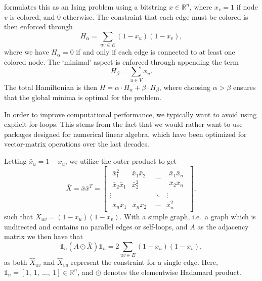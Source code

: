 \textcite{IsingFormulations} formulates this as an Ising problem using a bitstring $x \in \mathbb{R}^n$, where $x_v = 1$ if node $v$ is colored, and $0$ otherwise.
The constraint that each edge must be colored is then enforced through
\begin{equation}\label{eq:edge_cover}
    H_{\alpha} = \sum_{uv \in E} (1 - x_u) (1 - x_v),
\end{equation}
where we have $H_{\alpha} = 0$ if and only if each edge is connected to at least one colored node.
The `minimal' aspect is enforced through appending the term
\begin{equation}
    H_{\beta} = \sum_{u \in V} x_u.
\end{equation}
The total Hamiltonian is then $H = \alpha \cdot H_{\alpha} + \beta \cdot H_{\beta}$, where choosing $\alpha > \beta$ ensures that the global minima is optimal for the problem.

In order to improve computational performance, we typically want to avoid using explicit for-loops.
This stems from the fact that we would rather want to use packages designed for numerical linear algebra, which have been optimized for vector-matrix operations over the last decades.

Letting $\bar{x}_u = 1 - x_u$, we utilize the outer product to get
\begin{equation}
    \bar{X} = \bar{x} \bar{x}^T =
    \begin{bmatrix}
        \begin{matrix}
            \bar{x}_1^2 & \bar{x}_1 \bar{x}_2 \\
            \bar{x}_2 \bar{x}_1 & \bar{x}_2^2
        \end{matrix}
         & \cdots & 
         \begin{matrix}
            \bar{x}_1 \bar{x}_n \\
            \bar{x}_2 \bar{x}_n
         \end{matrix} \\
        \vdots & \ddots & \vdots \\
        \begin{matrix}
            \bar{x}_n \bar{x}_1 & \bar{x}_n \bar{x}_2 
        \end{matrix}
        & \cdots & \bar{x}_n^2
    \end{bmatrix},
\end{equation}
such that $\bar{X}_{uv} = (1 - x_u)(1 - x_v)$.
With a simple graph, i.e.\ a graph which is undirected and contains no parallel edges or self-loops, and $A$ as the adjacency matrix we then have that
\begin{equation}
    \mathds{1}_n \left( A \odot \bar{X} \right) \mathds{1}_n = 2 \sum_{uv \in E} (1 - x_u) (1 - x_v),
\end{equation}
as both $\hat{X}_{uv}$ and $\hat{X}_{vu}$ represent the constraint for a single edge.
Here, $\mathds{1}_n = [1, \ 1, \ \ldots, \ 1] \in \mathbb{R}^n$, and $\odot$ denotes the elementwise Hadamard product.


